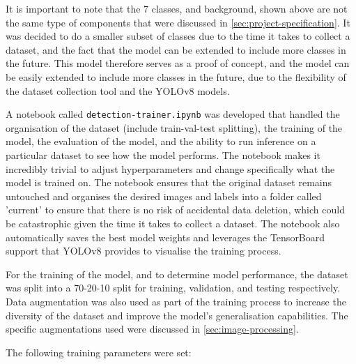 It is important to note that the 7 classes, and background, shown above are not the same type of components that were discussed in \autoref{sec:project-specification}. It was decided to do a smaller subset of classes due to the time it takes to collect a dataset, and the fact that the model can be extended to include more classes in the future. This model therefore serves as a proof of concept, and the model can be easily extended to include more classes in the future, due to the flexibility of the dataset collection tool and the YOLOv8 models.

A notebook called \texttt{detection-trainer.ipynb} was developed that handled the organisation of the dataset (include train-val-test splitting), the training of the model, the evaluation of the model, and the ability to run inference on a particular dataset to see how the model performs. The notebook makes it incredibly trivial to adjust hyperparameters and change specifically what the model is trained on. The notebook ensures that the original dataset remains untouched and organises the desired images and labels into a folder called 'current' to ensure that there is no risk of accidental data deletion, which could be catastrophic given the time it takes to collect a dataset. The notebook also automatically saves the best model weights and leverages the TensorBoard \cite{tensorboard} support that YOLOv8 provides to visualise the training process.

For the training of the model, and to determine model performance, the dataset was split into a 70-20-10 split for training, validation, and testing respectively. Data augmentation was also used as part of the training process to increase the diversity of the dataset and improve the model's generalisation capabilities. The specific augmentations used were discussed in \autoref{sec:image-processing}. 

The following training parameters were set:

